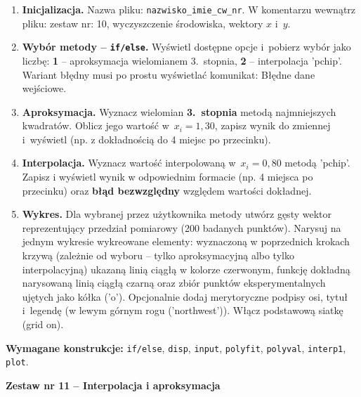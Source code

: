 \documentclass[a4paper,11pt]{article}
\begin{document}
\begin{enumerate}[leftmargin=*, label=\textbf{\arabic*.}, itemsep=2pt]

  \item \textbf{Inicjalizacja.}
    Nazwa pliku: \texttt{nazwisko\_imie\_cw\_nr}. W komentarzu wewnątrz pliku: zestaw nr: 10, wyczyszczenie środowiska, wektory $x$ i~$y$.

  \item \textbf{Wybór metody -- \texttt{if/else}.}
    Wyświetl dostępne opcje i~pobierz wybór jako liczbę: \textbf{1} -- aproksymacja wielomianem 3.~stopnia, \textbf{2} -- interpolacja 'pchip'. Wariant błędny musi po prostu wyświetlać komunikat: Błędne dane wejściowe.

  \item \textbf{Aproksymacja.}
    Wyznacz wielomian \textbf{3.~stopnia} metodą najmniejszych kwadratów. Oblicz jego wartość w~$x_i = 1{,}30$, zapisz wynik do zmiennej i~wyświetl (np. z dokładnością do 4 miejsc po przecinku).

  \item \textbf{Interpolacja.}
    Wyznacz wartość interpolowaną w~$x_i = 0{,}80$ metodą 'pchip'. Zapisz i wyświetl wynik w odpowiednim formacie (np. 4 miejsca po przecinku) oraz \textbf{błąd bezwzględny} względem wartości dokładnej.

  \item \textbf{Wykres.}
    Dla wybranej przez użytkownika metody utwórz gęsty wektor reprezentujący przedział pomiarowy (200 badanych punktów). Narysuj na jednym wykresie wykreowane elementy: wyznaczoną w poprzednich krokach krzywą (zależnie od wyboru -- tylko aproksymacyjną albo tylko interpolacyjną) ukazaną linią ciągłą w kolorze czerwonym, funkcję dokładną narysowaną linią ciągłą czarną oraz zbiór punktów eksperymentalnych ujętych jako kółka ('o'). Opcjonalnie dodaj merytoryczne podpisy osi, tytuł i~legendę (w lewym górnym rogu ('northwest')). Włącz podstawową siatkę (grid on).

\end{enumerate}

\vspace{0.3cm}
\begin{ramka}
\textbf{Wymagane konstrukcje:}
\texttt{if/else}, \texttt{disp}, \texttt{input}, \texttt{polyfit}, \texttt{polyval}, \texttt{interp1}, \texttt{plot}.
\end{ramka}

\clearpage
\begin{center}
  {\large\bfseries Zestaw nr 11 \quad -- \quad Interpolacja i aproksymacja}
\end{center}
\hrulefill
\vspace{0.4cm}
\end{document}
